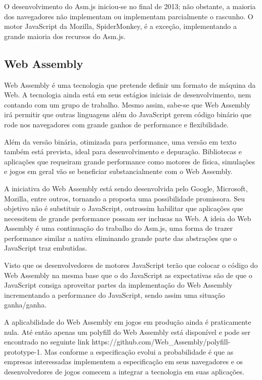 O desenvolvimento do Asm.js iniciou-se no final de 2013; não obstante,
a maioria dos navegadores não implementam ou implementam parcialmente o
rascunho. O motor JavaScript da Mozilla, SpiderMonkey, é a exceção,
implementando a grande maioria dos recursos do Asm.js.

\subsection{Web Assembly}
Web Assembly é uma tecnologia que pretende definir um formato de
máquina da Web. A tecnologia ainda está em seus estágios iniciais de
desenvolvimento, nem contando com um grupo de trabalho. Mesmo assim,
sabe-se que Web Assembly irá permitir que outras linguagens além do
JavaScript gerem código binário que rode nos navegadores com grande
ganhos de performance e flexibilidade.

Além da versão binária, otimizada para performance, uma versão em
texto também está prevista, ideal para desenvolvimento e depuração.
Bibliotecas e aplicações que requeiram grande performance como
motores de física, simulações e jogos em geral vão se beneficiar
substancialmente com o Web Assembly.

A iniciativa do Web Assembly está sendo desenvolvida pelo Google,
Microsoft, Mozilla, entre outros, tornando a proposta uma possibilidade
promissora. Seu objetivo não é substituir o JavaScript, outrossim
habilitar que aplicações que necessitem de grande performance possam
ser inclusas na Web. A ideia do Web Assembly é uma continuação
do trabalho do Asm.js, uma forma de trazer performance similar a
nativa eliminando grande parte das abstrações que o JavaScript
traz embutidas.

Visto que os desenvolvedores de motores JavaScript terão que colocar
o código do Web Assembly na mesma base que o do JavaScript as
expectativas são de que o JavaScript consiga aproveitar partes
da implementação do Web Assembly incrementando a performance do
JavaScript, sendo assim uma situação ganha/ganha.

A aplicabilidade do Web Assembly em jogos em produção ainda
é praticamente nula. Até então apenas um polyfill do Web
Assembly está disponível e pode ser encontrado no seguinte link
https://github.com/Web\_Assembly/polyfill-prototype-1. Mas conforme a
especificação evolui a probabilidade é que as empresas interessadas
implementem a especificação em seus navegadores e os desenvolvedores
de jogos comecem a integrar a tecnologia em suas aplicações.

